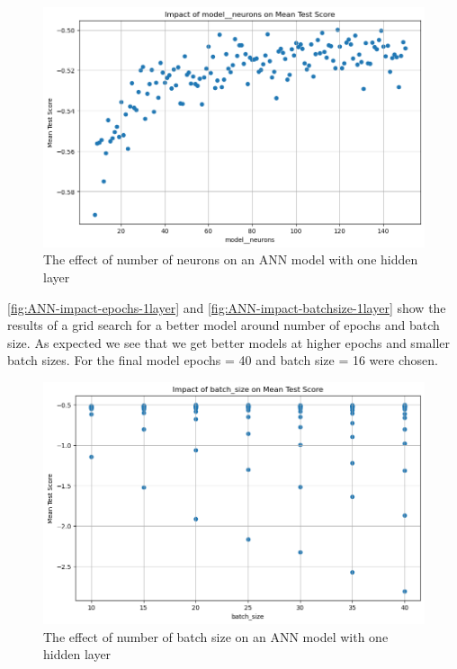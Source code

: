 \documentclass{article}
\begin{document}
\begin{figure}
	\centering
	\includegraphics[width=\linewidth]{figures/ANN_impact_neurons_1layer.png}
	\caption{The effect of number of neurons on an ANN model with one hidden layer}
	\label{fig:ANN-impact-neurons-1layer}
\end{figure}

\autoref{fig:ANN-impact-epochs-1layer} and \autoref{fig:ANN-impact-batchsize-1layer} show the results of a grid search for a better model around number of epochs and batch size.
As expected we see that we get better models at higher epochs and smaller batch sizes. For the final model epochs = 40 and batch size = 16 were chosen.

\begin{figure}
	\centering
	\includegraphics[width=\linewidth]{figures/ANN_impact_batchsize_1layer.png}
	\caption{The effect of number of batch size on an ANN model with one hidden layer}
	\label{fig:ANN-impact-batchsize-1layer}
\end{figure}
\end{document}
